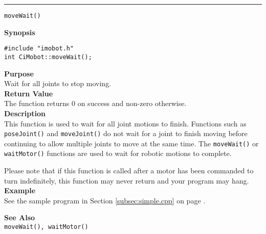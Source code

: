 \noindent
\vspace{5pt}
\rule{6.5in}{0.015in}
\noindent
{\LARGE \texttt{moveWait()}}\\
{}

\noindent
{\bf Synopsis}\\
\begin{verbatim}
#include "imobot.h"
int CiMobot::moveWait();
\end{verbatim}

\noindent
{\bf Purpose}\\
Wait for all joints to stop moving.\\

\noindent
{\bf Return Value}\\
The function returns 0 on success and non-zero otherwise.\\

\noindent
{\bf Description}\\
This function is used to wait for all joint motions to finish. Functions such as
\texttt{poseJoint()} and \texttt{moveJoint()} do not wait for a joint to finish
moving before continuing to allow multiple joints to move at the same time. The
\texttt{moveWait()} or \texttt{waitMotor()} functions are used to wait for
robotic motions to complete.

Please note that if this function is called after a motor has been commanded to
turn indefinitely, this function may never return and your program may hang.\\

\noindent
{\bf Example}\\
See the sample program in Section \ref{subsec:simple.cpp} on page \pageref{subsec:simple.cpp}.
\noindent

\noindent
{\bf See Also}\\
\texttt{moveWait(), waitMotor()}

